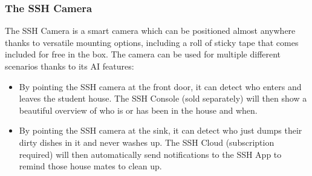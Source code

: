 \subsubsection{The SSH Camera}

The SSH Camera is a smart camera which can be positioned almost anywhere thanks to versatile mounting options, including a roll of sticky tape that comes included for free in the box. The camera can be used for multiple different scenarios thanks to its AI features:

\begin{itemize}
    \item By pointing the SSH camera at the front door, it can detect who enters and leaves the student house. The SSH Console (sold separately) will then show a beautiful overview of who is or has been in the house and when.
    \item By pointing the SSH camera at the sink, it can detect who just dumps their dirty dishes in it and never washes up. The SSH Cloud (subscription required) will then automatically send notifications to the SSH App to remind those house mates to clean up.
\end{itemize}

